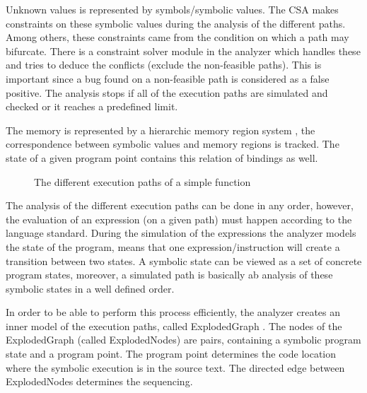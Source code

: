 \documentclass[oneside, a4paper, 12pt]{article}
\theoremstyle{definition}
\begin{document}
Unknown values is represented by symbols/symbolic values. The CSA makes 
constraints on these symbolic values during the analysis of the different 
paths. Among others, these constraints came from the condition on which a path 
may bifurcate. There is a constraint solver module in the analyzer which 
handles these and tries to deduce the conflicts (exclude the non-feasible 
paths). This is important since a bug found on a non-feasible path is 
considered as a false positive. The analysis stops if all of the execution 
paths are simulated and checked or it reaches a predefined limit.

The memory is represented by a hierarchic memory region system 
\cite{clang:memmodel}, the correspondence between symbolic values and memory 
regions is tracked. The state of a given program point contains this relation 
of bindings as well.

\begin{figure}[h]
	\centering
	\caption{The different execution paths of a simple function}
	\label{fig:exec_path}
\end{figure}

The analysis of the different execution paths can be done in any order, 
however, the evaluation of an expression (on a given path) must happen 
according to the language standard.  
During the simulation of the expressions the analyzer models the state of the 
program, means that one expression/instruction will create a transition between 
two states. A symbolic state can be viewed as a set of concrete program states, 
moreover, a simulated path is basically ab analysis of these symbolic states in 
a well defined order. 

In order to be able to perform this process efficiently, the analyzer creates 
an inner model of the execution paths, called ExplodedGraph 
\cite{explodedgraph}. The nodes of the ExplodedGraph (called ExplodedNodes) are 
pairs, containing a symbolic program state and a program point. The program 
point determines the code location where the symbolic execution is in the 
source text. The directed edge between ExplodedNodes determines the sequencing.
\end{document}
